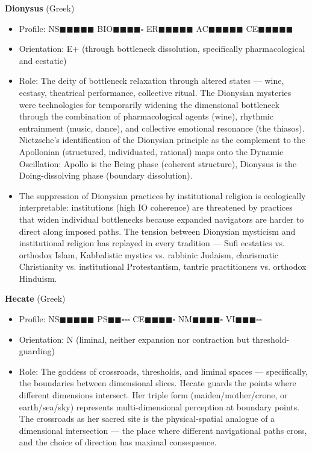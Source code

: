 \textbf{Dionysus} (Greek)

\begin{itemize}[nosep,leftmargin=*]
  \item Profile: NS$\blacksquare$$\blacksquare$$\blacksquare$$\blacksquare$$\blacksquare$ BIO$\blacksquare$$\blacksquare$$\blacksquare$$\blacksquare$$\square$ ER$\blacksquare$$\blacksquare$$\blacksquare$$\blacksquare$$\blacksquare$ AC$\blacksquare$$\blacksquare$$\blacksquare$$\blacksquare$$\blacksquare$ CE$\blacksquare$$\blacksquare$$\blacksquare$$\blacksquare$$\blacksquare$
  \item Orientation: E+ (through bottleneck dissolution, specifically pharmacological and ecstatic)
  \item Role: The deity of bottleneck relaxation through altered states — wine, ecstasy, theatrical performance, collective ritual. The Dionysian mysteries were technologies for temporarily widening the dimensional bottleneck through the combination of pharmacological agents (wine), rhythmic entrainment (music, dance), and collective emotional resonance (the thiasos). Nietzsche's identification of the Dionysian principle as the complement to the Apollonian (structured, individuated, rational) maps onto the Dynamic Oscillation: Apollo is the Being phase (coherent structure), Dionysus is the Doing-dissolving phase (boundary dissolution).
  \item The suppression of Dionysian practices by institutional religion is ecologically interpretable: institutions (high IO coherence) are threatened by practices that widen individual bottlenecks because expanded navigators are harder to direct along imposed paths. The tension between Dionysian mysticism and institutional religion has replayed in every tradition — Sufi ecstatics vs. orthodox Islam, Kabbalistic mystics vs. rabbinic Judaism, charismatic Christianity vs. institutional Protestantism, tantric practitioners vs. orthodox Hinduism.
\end{itemize}


\textbf{Hecate} (Greek)

\begin{itemize}[nosep,leftmargin=*]
  \item Profile: NS$\blacksquare$$\blacksquare$$\blacksquare$$\blacksquare$$\blacksquare$ PS$\blacksquare$$\blacksquare$$\square$$\square$$\square$ CE$\blacksquare$$\blacksquare$$\blacksquare$$\blacksquare$$\square$ NM$\blacksquare$$\blacksquare$$\blacksquare$$\blacksquare$$\square$ VI$\blacksquare$$\blacksquare$$\blacksquare$$\square$$\square$
  \item Orientation: N (liminal, neither expansion nor contraction but threshold-guarding)
  \item Role: The goddess of crossroads, thresholds, and liminal spaces — specifically, the boundaries between dimensional slices. Hecate guards the points where different dimensions intersect. Her triple form (maiden/mother/crone, or earth/sea/sky) represents multi-dimensional perception at boundary points. The crossroads as her sacred site is the physical-spatial analogue of a dimensional intersection — the place where different navigational paths cross, and the choice of direction has maximal consequence.
\end{itemize}


